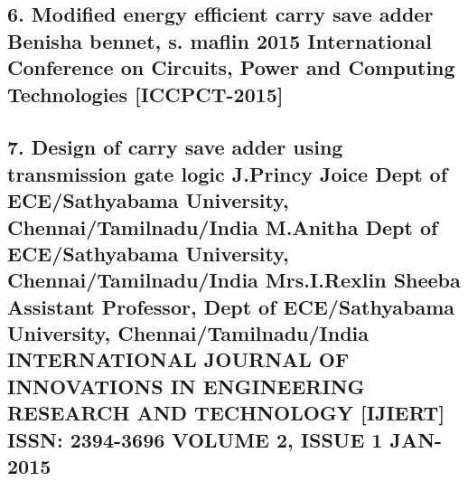 \documentclass[11pt, twoside]{article}
\begin{document}
 \subsection{6. Modified energy efficient carry save adder
 Benisha bennet, s. maflin
 2015 International Conference on Circuits, Power and Computing Technologies [ICCPCT-2015]}
\subsection{7.  Design of carry save adder using transmission gate logic
 J.Princy Joice 
Dept of ECE/Sathyabama University, Chennai/Tamilnadu/India 
M.Anitha
Dept of ECE/Sathyabama University, Chennai/Tamilnadu/India 
Mrs.I.Rexlin Sheeba
Assistant Professor, Dept of ECE/Sathyabama University, Chennai/Tamilnadu/India
 INTERNATIONAL JOURNAL OF INNOVATIONS IN ENGINEERING
 RESEARCH AND TECHNOLOGY [IJIERT] 
ISSN: 
2394-3696 
VOLUME 2, ISSUE 1 JAN-2015}
\end{document}
